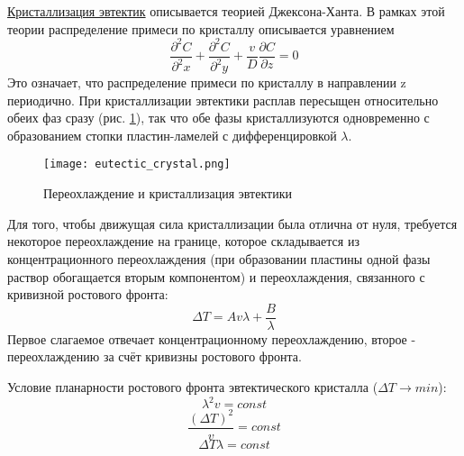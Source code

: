 \par
\underline{Кристаллизация эвтектик} описывается теорией Джексона-Ханта. В рамках этой теории распределение примеси по кристаллу описывается уравнением
\begin{equation}
\frac{\partial^2C}{\partial^2x}+\frac{\partial^2C}{\partial^2y}+\frac{v}{D}\frac{\partial C}{\partial z} = 0
\label{eq:Jackson-Hant_concentration}  
\end{equation}
Это означает, что распределение примеси по кристаллу в направлении z периодично. При кристаллизации эвтектики расплав пересыщен относительно обеих фаз сразу (рис. \ref{fig:eutectic_crystal}), так что обе фазы кристаллизуются одновременно с образованием стопки пластин-ламелей с дифференцировкой $\lambda$. 
\begin{figure}[h!]
\centering
\texttt{[image: eutectic\_crystal.png]}\caption{Переохлаждение и кристаллизация эвтектики}\label{fig:eutectic_crystal}
\end{figure}
\par Для того, чтобы движущая сила кристаллизации была отлична от нуля, требуется некоторое переохлаждение на границе, которое складывается из концентрационного переохлаждения (при образовании пластины одной фазы раствор обогащается вторым компонентом) и переохлаждения, связанного с кривизной ростового фронта:
\begin{equation}
\Delta T = Av\lambda + \frac{B}{\lambda}
\label{eq:eutectic_undercooling}  
\end{equation}
Первое слагаемое отвечает концентрационному переохлаждению, второе - переохлаждению за счёт кривизны ростового фронта.
\par Условие планарности ростового фронта эвтектического кристалла ($\Delta T \rightarrow min$): 
\begin{equation}
\lambda^2v=const
\label{eq:eutectic_planar_face1}  
\end{equation}
\begin{equation}
\frac{(\Delta T)^2}{v}=const
\label{eq:eutectic_planar_face2}  
\end{equation}
\begin{equation}
\Delta T \lambda = const
\label{eq:eutectic_planar_face3}  
\end{equation}
